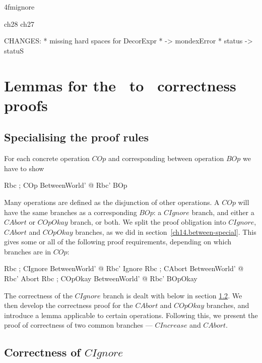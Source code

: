 \ai4fmignore{
\begin{zsection}
  \SECTION ch28 \parents ch27
\end{zsection}
CHANGES:
* missing hard spaces for DecorExpr
* \bot -> mondexError
* status -> statuS
}
\chapter[\Betw\ to \Conc\ lemmas]{Lemmas for the \Betw\ to \Conc\ correctness proofs} \label{ch28} %

\section{Specialising the proof rules}\label{ch28.bc-ignore-spec}

For each concrete operation $COp$ and corresponding between
operation $BOp$ we have to show

\begin{gzed}
  Rbc ; COp
  \shows \exists BetweenWorld' @ Rbc' \land BOp
\end{gzed}
Many operations are defined as the disjunction of other operations.
A $COp$ will have the same branches as a corresponding $BOp$: a
$CIgnore$ branch, and either a $CAbort$ or $COpOkay$ branch, or
both. We split the proof obligation into $CIgnore$, $CAbort$ and
$COpOkay$ branches, as we did in section~\ref{ch14.between-special}.
This gives some or all of the following proof requirements,
depending on which branches are in $COp$:
%
\begin{gzed}
  Rbc ; CIgnore
  \shows \exists BetweenWorld' @ Rbc' \land Ignore
  \also %
  Rbc ; CAbort
  \shows \exists BetweenWorld' @ Rbc' \land Abort
  \also %
  Rbc ;  COpOkay
  \shows \exists BetweenWorld'  @ Rbc' \land BOpOkay
\end{gzed}
%
The correctness of the $CIgnore$ branch is dealt with below in
section \ref{ch28.bc-ignore-ignore}.  We then develop the
correctness proof for the $CAbort$ and $COpOkay$ branches, and
introduce a lemma applicable to certain operations.  Following this,
we present the proof of correctness of two common branches ---
$CIncrease$ and $CAbort$.

\section{Correctness of $CIgnore$}\label{ch28.bc-ignore-ignore}

